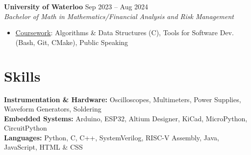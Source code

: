 \documentclass[10pt,letterpaper]{article}
\begin{document}
\raggedright
\textbf{University of Waterloo} \hfill
Sep 2023 -- Aug 2024 \\
\textit{Bachelor of Math in Mathematics/Financial Analysis and Risk Management} \hfill
\begin{itemize}
    \item \underline{Coursework}: 
    Algorithms \& Data Structures (C), 
    Tools for Software Dev. (Bash, Git, CMake), 
    Public Speaking
\end{itemize}













\section{Skills}

\hspace{0.75em}\textbf{Instrumentation \& Hardware:} 
    Oscilloscopes, Multimeters, Power Supplies, Waveform Generators, Soldering \\

\hspace{0.75em}\textbf{Embedded Systems:} 
    Arduino, ESP32, Altium Designer, KiCad, MicroPython, CircuitPython \\

\hspace{0.75em}\textbf{Languages:} 
    Python, C, C++, SystemVerilog, RISC-V Assembly, Java, JavaScript, HTML \& CSS \\
\end{document}
